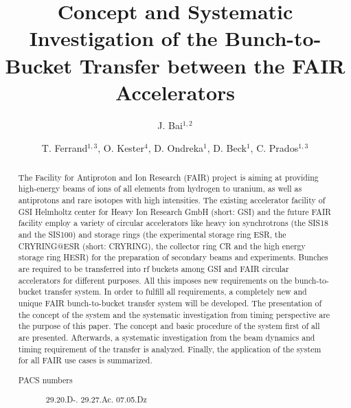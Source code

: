\documentclass[%
 reprint,
 amsmath,amssymb,
 aps,
]{revtex4-1}
\begin{document}

\title{Concept and Systematic Investigation of the Bunch-to-Bucket Transfer between the FAIR Accelerators}%

\author{J. Bai$^{1,2}$}
\author{T. Ferrand$^{1,3}$, O. Kester$^{4}$, D. Ondreka$^{1}$, D. Beck$^{1}$, C. Prados$^{1,3}$}%



\begin{abstract} 
The Facility for Antiproton and Ion Research (FAIR) project is aiming at providing high-energy beams of ions of all elements
from hydrogen to uranium, as well as antiprotons and rare isotopes with high intensities. The existing accelerator facility of GSI  Helmholtz center for Heavy Ion Research GmbH (short: GSI) and the future FAIR facility employ a variety of circular accelerators like heavy ion synchrotrons (the SIS18 and the
SIS100) and storage rings (the experimental storage ring ESR, the CRYRING@ESR (short: CRYRING), the collector ring CR and the high energy storage ring HESR) for the preparation of secondary beams and experiments. Bunches are required to be transferred into rf buckets among GSI and FAIR circular accelerators for different purposes. All this imposes new requirements on the bunch-to-bucket transfer system. In order to fulfill all requirements, a completely new and unique FAIR bunch-to-bucket transfer system will be developed. The presentation of the concept of the system and the systematic investigation from timing perspective are the purpose of this paper. The concept and basic procedure of the system first of all are presented. Afterwards, a systematic investigation from the beam dynamics and timing requirement of the transfer is analyzed. Finally, the application of the system for all FAIR use cases is summarized.


\begin{description}
\item[PACS numbers]
29.20.D-. 29.27.Ac. 07.05.Dz

\end{description}
\end{abstract}
\end{document}
